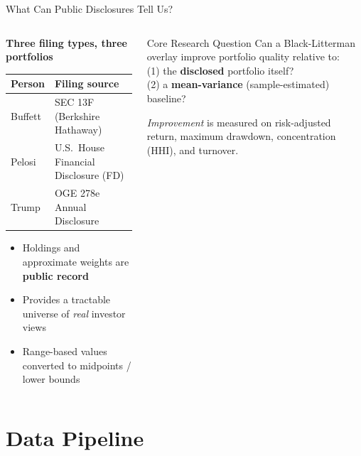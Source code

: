 \documentclass[aspectratio=169, 10pt]{beamer}
\begin{document}
\begin{frame}{What Can Public Disclosures Tell Us?}

  \begin{columns}[T]
    \begin{column}{0.52\textwidth}
      \textbf{Three filing types, three portfolios}
      \medskip

      \begin{tabular}{@{}L{1.6cm} L{4.4cm}@{}}
        \toprule
        \textbf{Person} & \textbf{Filing source} \\
        \midrule
        Buffett  & SEC 13F (Berkshire Hathaway) \\[2pt]
        Pelosi   & U.S.\ House Financial Disclosure (FD)\\[2pt]
        Trump    & OGE 278e Annual Disclosure \\
        \bottomrule
      \end{tabular}
      \bigskip

      \begin{itemize}
        \item Holdings and approximate weights are \textbf{public record}
        \item Provides a tractable universe of \emph{real} investor views
        \item Range-based values converted to midpoints / lower bounds
      \end{itemize}
    \end{column}

    \begin{column}{0.44\textwidth}
      \begin{block}{Core Research Question}
        Can a Black-Litterman overlay improve portfolio
        quality relative to:\\[6pt]
        \quad (1) the \textbf{disclosed} portfolio itself?\\[4pt]
        \quad (2) a \textbf{mean-variance} (sample-estimated) baseline?
      \end{block}
      \bigskip
      \textit{Improvement} is measured on risk-adjusted return,
      maximum drawdown, concentration (HHI), and turnover.
    \end{column}
  \end{columns}
\end{frame}

\section{Data Pipeline}
\end{document}
